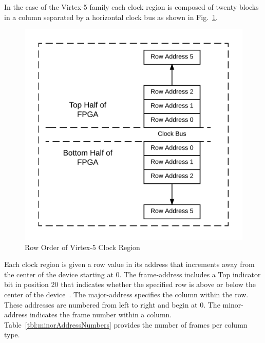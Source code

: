 \documentclass[journal, hidelinks]{IEEEtran}
\begin{document}
In the case of the Virtex-5 family each clock region is composed of twenty blocks in a column separated by a horizontal clock bus as shown in Fig.~\ref{fig:RowOrder}.
\begin{figure}[h]
	\centering
	\includegraphics[width=1\linewidth]{Figures/RowOrder}
	\caption[Row Order of Virtex-5 Clock Region]{Row Order of Virtex-5 Clock Region}
	\label{fig:RowOrder}
\end{figure}
Each clock region is given a row value in its address that increments away from the center of the device starting at 0. 
The frame-address includes a Top indicator bit in position 20 that indicates whether the specified row is above or below the center of the device~\cite{virtex5ConfigGuide}.
The major-address specifies the column within the row.
These addresses are numbered from left to right and begin at 0.
The minor-address indicates the frame number within a column. 
Table~\ref{tbl:minorAddressNumbers} provides the number of frames per column type.
\end{document}
